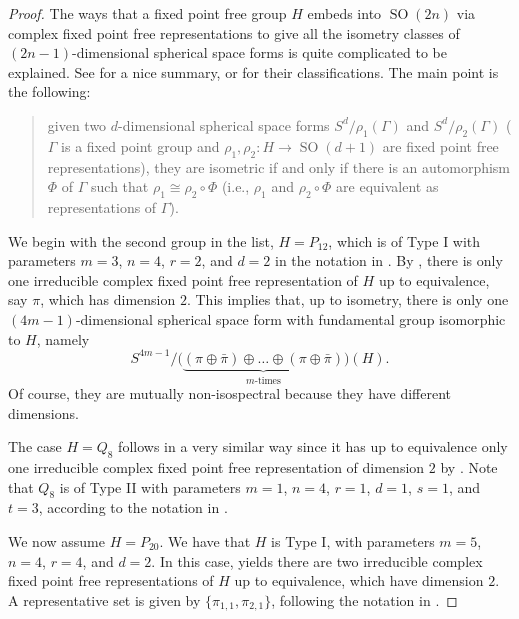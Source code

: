 \documentclass[12pt,a4paper,final]{amsart}
\theoremstyle{plain}
\theoremstyle{definition}
\theoremstyle{remark}
\numberwithin{equation}{section}
\DeclareMathOperator{\SO}{SO}
\begin{document}
\begin{proof}
The ways that a fixed point free group $H$ embeds into $\SO(2n)$ via complex fixed point free representations to give all the isometry classes of $(2n-1)$-dimensional spherical space forms is quite complicated to be explained. 
See \cite[\S4--5]{Wolf01} for a nice summary, or \cite[\S7.2--3]{Wolf-book} for their classifications. 
The main point is the following: 
\begin{quote}
given two $d$-dimensional spherical space forms $S^{d}/\rho_1(\Gamma)$ and $S^{d}/\rho_2(\Gamma)$ ($\Gamma$ is a fixed point group and $\rho_1,\rho_2:H\to\SO(d+1)$ are fixed point free representations), they are isometric if and only if there is an automorphism $\Phi$ of $\Gamma$ such that $\rho_1\cong\rho_2\circ\Phi$ (i.e., $\rho_1$ and $\rho_2\circ\Phi$ are equivalent as representations of $\Gamma$). 
\end{quote}

We begin with the second group in the list, $H= P_{12}$, which is of Type I with parameters $m=3$, $n=4$, $r=2$, and $d=2$ in the notation in \cite{Wolf01}. 
By \cite[Prop.~4.19]{Wolf01}, there is only one irreducible complex fixed point free representation of $H$ up to equivalence, say $\pi$, which has dimension $2$.
This implies that, up to isometry, there is only one $(4m-1)$-dimensional spherical space form with fundamental group isomorphic to $H$, namely
\begin{equation}
S^{4m-1}/\big(\underbrace{(\pi\oplus\bar\pi)\oplus \dots \oplus (\pi\oplus\bar\pi) }_{m\text{-times}}\big)(H). 
\end{equation}
Of course, they are mutually non-isospectral because they have different dimensions. 

The case $H=Q_8$ follows in a very similar way since it has up to equivalence only one irreducible complex fixed point free representation of dimension $2$ by \cite[Prop.~4.19]{Wolf01}. 
Note that $Q_{8}$ is of Type II with parameters $m=1$, $n=4$, $r=1$, $d=1$, $s=1$, and $t=3$, according to the notation in \cite{Wolf01}. 

We now assume $H=P_{20}$. 
We have that $H$ is Type I, with parameters $m=5$, $n=4$, $r=4$, and $d=2$. 
In this case, \cite[Prop.~4.19]{Wolf01} yields there are two irreducible complex fixed point free representations of $H$ up to equivalence, which have dimension $2$.
A representative set is given by $\{\pi_{1,1}, \pi_{2,1}\}$, following the notation in \cite[(4.1)]{Wolf01}. 


\end{proof}
\end{document}
